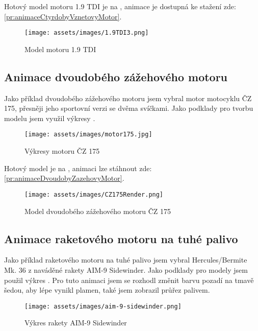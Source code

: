 {Hotový model motoru 1.9 TDI je na , animace je dostupná ke stažení zde: \ref{pr:animaceCtyrdobyVznetovyMotor}.}

\begin{figure}[H]
    \centering
    \texttt{[image: assets/images/1.9TDI3.png]}
    \caption{Model motoru 1.9 TDI \jaObr}
    \label{obr:1.9TDImodel}
\end{figure}

\newpage

\subsection{Animace dvoudobého zážehového motoru}
{Jako příklad dvoudobého zážehového motoru jsem vybral motor motocyklu ČZ 175, přesněji jeho sportovní verzi se dvěma svíčkami. Jako podklady pro tvorbu modelu jsem využil výkresy .}
\cite{MZ:CZ175}

\begin{figure}[H]
    \centering
    \texttt{[image: assets/images/motor175.jpg]}
    \caption{Výkresy motoru ČZ 175}
    \label{obr:CZ175Vykres}
\end{figure}

{Hotový model je na , animaci lze stáhnout zde: \ref{pr:animaceDvoudobyZazehovyMotor}.}

\begin{figure}[H]
    \centering
    \texttt{[image: assets/images/CZ175Render.png]}
    \caption{Model dvoudobého zážehového motoru ČZ 175 \jaObr}
    \label{obr:CZ175Render}
\end{figure}

\newpage

\subsection{Animace raketového motoru na tuhé palivo}
{Jako příklad raketového motoru na tuhé palivo jsem vybral Hercules/Bermite Mk. 36 z naváděné rakety AIM-9 Sidewinder. Jako podklady pro modely jsem použil výkres . Pro tuto animaci jsem se rozhodl změnit barvu pozadí na tmavě šedou, aby lépe vynikl plamen, také jsem zobrazil průřez palivem.}
\cite{TB:AIM9Sidewinder}

\begin{figure}[H]
    \centering
    \texttt{[image: assets/images/aim-9-sidewinder.png]}
    \caption{Výkres rakety AIM-9 Sidewinder}
    \label{obr:AIM9vykres}
\end{figure}

